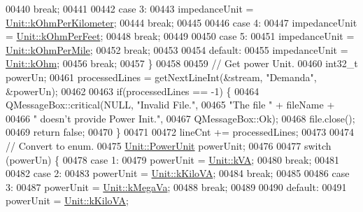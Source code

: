 \begin{DoxyCode}
00440     \textcolor{keywordflow}{break};
00441 
00442   \textcolor{keywordflow}{case} 3:
00443     impedanceUnit = \hyperlink{class_unit_a3747e779c805df24a71961290be3fbdfa56a0289d2ddeff7ca4aa8ba410df79d6}{Unit::kOhmPerKilometer};
00444     \textcolor{keywordflow}{break};
00445 
00446   \textcolor{keywordflow}{case} 4:
00447     impedanceUnit = \hyperlink{class_unit_a3747e779c805df24a71961290be3fbdfa433b57934ca3be960ec7a60f3ea6ea87}{Unit::kOhmPerFeet};
00448     \textcolor{keywordflow}{break};
00449 
00450   \textcolor{keywordflow}{case} 5:
00451     impedanceUnit = \hyperlink{class_unit_a3747e779c805df24a71961290be3fbdfa1d5bb04c9ecda66b09891af21cd4f613}{Unit::kOhmPerMile};
00452     \textcolor{keywordflow}{break};
00453 
00454   \textcolor{keywordflow}{default}:
00455     impedanceUnit = \hyperlink{class_unit_a3747e779c805df24a71961290be3fbdfa6b9c74d1763eefbaf751eeecff0bd9da}{Unit::kOhm};
00456     \textcolor{keywordflow}{break};
00457   \}
00458 
00459   \textcolor{comment}{// Get power Unit.}
00460   int32\_t powerUn;
00461   processedLines = getNextLineInt(&stream, \textcolor{stringliteral}{"Demanda"}, &powerUn);
00462 
00463   \textcolor{keywordflow}{if}(processedLines == -1) \{
00464     QMessageBox::critical(NULL, \textcolor{stringliteral}{"Invalid File."},
00465                           \textcolor{stringliteral}{"The file "} + fileName +
00466                           \textcolor{stringliteral}{" doesn't provide Power Init."},
00467                           QMessageBox::Ok);
00468     file.close();
00469     \textcolor{keywordflow}{return} \textcolor{keyword}{false};
00470   \}
00471 
00472   lineCnt += processedLines;
00473 
00474   \textcolor{comment}{// Convert to enum.}
00475   \hyperlink{class_unit_ace265ae255370ccacfd5370337572c3b}{Unit::PowerUnit} powerUnit;
00476 
00477   \textcolor{keywordflow}{switch} (powerUn) \{
00478   \textcolor{keywordflow}{case} 1:
00479     powerUnit = \hyperlink{class_unit_ace265ae255370ccacfd5370337572c3ba72b181a842ae2759488a2fa1410d3696}{Unit::kVA};
00480     \textcolor{keywordflow}{break};
00481 
00482   \textcolor{keywordflow}{case} 2:
00483     powerUnit = \hyperlink{class_unit_ace265ae255370ccacfd5370337572c3bac9e5154522fbb810d7aed75c3ff47cb2}{Unit::kKiloVA};
00484     \textcolor{keywordflow}{break};
00485 
00486   \textcolor{keywordflow}{case} 3:
00487     powerUnit = \hyperlink{class_unit_ace265ae255370ccacfd5370337572c3ba6039da0ed20f8bee64305bab8bdec365}{Unit::kMegaVa};
00488     \textcolor{keywordflow}{break};
00489 
00490   \textcolor{keywordflow}{default}:
00491     powerUnit = \hyperlink{class_unit_ace265ae255370ccacfd5370337572c3bac9e5154522fbb810d7aed75c3ff47cb2}{Unit::kKiloVA};

\end{DoxyCode}
